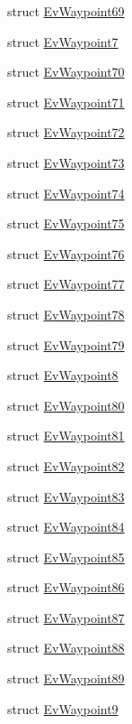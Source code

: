 \begin{DoxyCompactItemize}
struct \hyperlink{structsmacc_1_1EvWaypoint69}{Ev\+Waypoint69}
\item 
struct \hyperlink{structsmacc_1_1EvWaypoint7}{Ev\+Waypoint7}
\item 
struct \hyperlink{structsmacc_1_1EvWaypoint70}{Ev\+Waypoint70}
\item 
struct \hyperlink{structsmacc_1_1EvWaypoint71}{Ev\+Waypoint71}
\item 
struct \hyperlink{structsmacc_1_1EvWaypoint72}{Ev\+Waypoint72}
\item 
struct \hyperlink{structsmacc_1_1EvWaypoint73}{Ev\+Waypoint73}
\item 
struct \hyperlink{structsmacc_1_1EvWaypoint74}{Ev\+Waypoint74}
\item 
struct \hyperlink{structsmacc_1_1EvWaypoint75}{Ev\+Waypoint75}
\item 
struct \hyperlink{structsmacc_1_1EvWaypoint76}{Ev\+Waypoint76}
\item 
struct \hyperlink{structsmacc_1_1EvWaypoint77}{Ev\+Waypoint77}
\item 
struct \hyperlink{structsmacc_1_1EvWaypoint78}{Ev\+Waypoint78}
\item 
struct \hyperlink{structsmacc_1_1EvWaypoint79}{Ev\+Waypoint79}
\item 
struct \hyperlink{structsmacc_1_1EvWaypoint8}{Ev\+Waypoint8}
\item 
struct \hyperlink{structsmacc_1_1EvWaypoint80}{Ev\+Waypoint80}
\item 
struct \hyperlink{structsmacc_1_1EvWaypoint81}{Ev\+Waypoint81}
\item 
struct \hyperlink{structsmacc_1_1EvWaypoint82}{Ev\+Waypoint82}
\item 
struct \hyperlink{structsmacc_1_1EvWaypoint83}{Ev\+Waypoint83}
\item 
struct \hyperlink{structsmacc_1_1EvWaypoint84}{Ev\+Waypoint84}
\item 
struct \hyperlink{structsmacc_1_1EvWaypoint85}{Ev\+Waypoint85}
\item 
struct \hyperlink{structsmacc_1_1EvWaypoint86}{Ev\+Waypoint86}
\item 
struct \hyperlink{structsmacc_1_1EvWaypoint87}{Ev\+Waypoint87}
\item 
struct \hyperlink{structsmacc_1_1EvWaypoint88}{Ev\+Waypoint88}
\item 
struct \hyperlink{structsmacc_1_1EvWaypoint89}{Ev\+Waypoint89}
\item 
struct \hyperlink{structsmacc_1_1EvWaypoint9}{Ev\+Waypoint9}
\item 

\end{DoxyCompactItemize}
